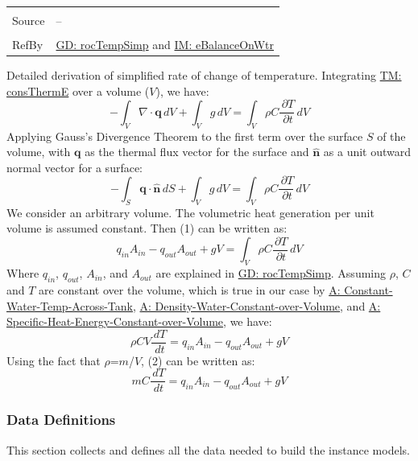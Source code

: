 \documentclass[12pt]{article}
\begin{document}
\begin{minipage}{\textwidth}
\begin{tabular}{>{\raggedright}p{}>{\raggedright\arraybackslash}p{}}
\\ \midrule \\
Source & --
\\ \midrule \\
RefBy & \hyperref[GD:rocTempSimp]{GD: rocTempSimp} and \hyperref[IM:eBalanceOnWtr]{IM: eBalanceOnWtr}
\\ \bottomrule \end{tabular}
\end{minipage}
Detailed derivation of simplified rate of change of temperature.
Integrating \hyperref[TM:consThermE]{TM: consThermE} over a volume ($V$), we have:
\begin{displaymath}
-\int_{V}{∇\cdot{}\mathbf{q}}\,dV+\int_{V}{g}\,dV=\int_{V}{ρ C \frac{\,\partial{}T}{\,\partial{}t}}\,dV
\end{displaymath}
Applying Gauss's Divergence Theorem to the first term over the surface $S$ of the volume, with $\mathbf{q}$ as the thermal flux vector for the surface and $\mathbf{\hat{n}}$ as a unit outward normal vector for a surface:
\begin{displaymath}
-\int_{S}{\mathbf{q}\cdot{}\mathbf{\hat{n}}}\,dS+\int_{V}{g}\,dV=\int_{V}{ρ C \frac{\,\partial{}T}{\,\partial{}t}}\,dV
\end{displaymath}
We consider an arbitrary volume. The volumetric heat generation per unit volume is assumed constant. Then (1) can be written as:
\begin{displaymath}
{q_{in}} {A_{in}}-{q_{out}} {A_{out}}+g V=\int_{V}{ρ C \frac{\,\partial{}T}{\,\partial{}t}}\,dV
\end{displaymath}
Where ${q_{in}}$, ${q_{out}}$, ${A_{in}}$, and ${A_{out}}$ are explained in \hyperref[GD:rocTempSimp]{GD: rocTempSimp}. Assuming $ρ$, $C$ and $T$ are constant over the volume, which is true in our case by \hyperref[assumpCWTAT]{A: Constant-Water-Temp-Across-Tank}, \hyperref[assumpDWCoW]{A: Density-Water-Constant-over-Volume}, and \hyperref[assumpSHECoW]{A: Specific-Heat-Energy-Constant-over-Volume}, we have:
\begin{displaymath}
ρ C V \frac{\,dT}{\,dt}={q_{in}} {A_{in}}-{q_{out}} {A_{out}}+g V
\end{displaymath}
Using the fact that $ρ$=$m$/$V$, (2) can be written as:
\begin{displaymath}
m C \frac{\,dT}{\,dt}={q_{in}} {A_{in}}-{q_{out}} {A_{out}}+g V
\end{displaymath}
\subsubsection{Data Definitions}
\label{Sec:DDs}
This section collects and defines all the data needed to build the instance models.
\par~
\end{document}
